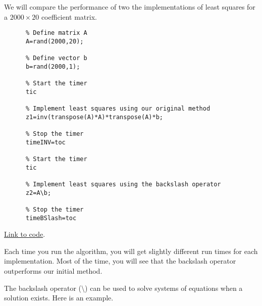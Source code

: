 \documentclass{ximera}
\begin{document}
\begin{example}\label{ex:LeastSquaresComp2}
We will compare the performance of two the implementations of least squares for a $2000\times 20$ coefficient matrix.

    \begin{verbatim}
      % Define matrix A
      A=rand(2000,20);
              
      % Define vector b
      b=rand(2000,1);
      
      % Start the timer
      tic
      
      % Implement least squares using our original method
      z1=inv(transpose(A)*A)*transpose(A)*b;
      
      % Stop the timer
      timeINV=toc
      
      % Start the timer
      tic
      
      % Implement least squares using the backslash operator
      z2=A\b;
      
      % Stop the timer
      timeBSlash=toc
    \end{verbatim}

\href{https://sagecell.sagemath.org/?z=eJylkD0LwkAMhveD-w9ZhCoOtat0qLi4uBScXNIa7WHvrubSIv56e_iBLi6GLCFPeF4ygTUdjSOwKGyuUGhV5IzukGRpms6zdLrUCp6l1eSFD1SLZ6i0qj7wRaQjVQqygDQEYiyxVmLqx2Zju5YsOYGWMAiES49MAfpg3Al8z-DZnIzDFixJ4w9a3Ra5cUMioyd0PlBSTGdjf83VW-y7b6-lzXaXi6__SxYvKqzPocXQgO-IcXzAGC7Li_0v-6qMFzHAHTlDb7g=&lang=octave&interacts=eJyLjgUAARUAuQ==}{Link to code}.   

Each time you run the algorithm, you will get slightly different run times for each implementation.  Most of the time, you will see that the backslash operator outperforms our initial method. 
\end{example}

The 
backslash operator ($\setminus$) can be used to solve systems of equations when a solution exists.  Here is an example.
\end{document}
